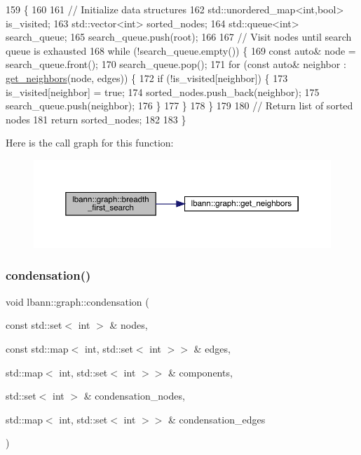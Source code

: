 \begin{DoxyCode}
159                                                                             \{
160 
161   \textcolor{comment}{// Initialize data structures}
162   std::unordered\_map<int,bool> is\_visited;
163   std::vector<int> sorted\_nodes;
164   std::queue<int> search\_queue;
165   search\_queue.push(root);
166 
167   \textcolor{comment}{// Visit nodes until search queue is exhausted}
168   \textcolor{keywordflow}{while} (!search\_queue.empty()) \{
169     \textcolor{keyword}{const} \textcolor{keyword}{auto}& node = search\_queue.front();
170     search\_queue.pop();
171     \textcolor{keywordflow}{for} (\textcolor{keyword}{const} \textcolor{keyword}{auto}& neighbor : \hyperlink{namespacelbann_1_1graph_ad305e0d104d25d9cb1e63a4b93c0847c}{get\_neighbors}(node, edges)) \{
172       \textcolor{keywordflow}{if} (!is\_visited[neighbor]) \{
173         is\_visited[neighbor] = \textcolor{keyword}{true};
174         sorted\_nodes.push\_back(neighbor);
175         search\_queue.push(neighbor);
176       \}
177     \}
178   \}
179 
180   \textcolor{comment}{// Return list of sorted nodes}
181   \textcolor{keywordflow}{return} sorted\_nodes;
182 
183 \}
\end{DoxyCode}
Here is the call graph for this function\+:\nopagebreak
\begin{figure}[H]
\begin{center}
\leavevmode
\includegraphics[width=350pt]{namespacelbann_1_1graph_a6cc9ff6e6b9707deaa1c77c3b8eb0b20_cgraph}
\end{center}
\end{figure}
\mbox{\label{namespacelbann_1_1graph_ae06c3de1931d3786348995d870b792ca}} 
\subsubsection{\texorpdfstring{condensation()}{condensation()}}
{\footnotesize\ttfamily void lbann\+::graph\+::condensation (\begin{DoxyParamCaption}\item[{const std\+::set$<$ int $>$ \&}]{nodes,  }\item[{const std\+::map$<$ int, std\+::set$<$ int $>$$>$ \&}]{edges,  }\item[{std\+::map$<$ int, std\+::set$<$ int $>$$>$ \&}]{components,  }\item[{std\+::set$<$ int $>$ \&}]{condensation\+\_\+nodes,  }\item[{std\+::map$<$ int, std\+::set$<$ int $>$$>$ \&}]{condensation\+\_\+edges }\end{DoxyParamCaption})}

